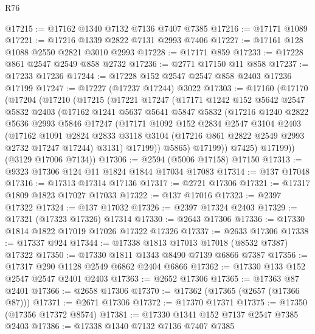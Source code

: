 \begin{lexlean}{R76}
\begin{coremodule}
@17215 := @17162 @1340 @7132 @7136 @7407 @7385
@17216 := @17171 @1089
@17221 := @17216 @1339 @2822 @7131 @2993 @7406
@17227 := @17161 @128 @1088 @2550 @2821 @3010 @2993
@17228 := @17171 @859
@17233 := @17228 @861 @2547 @2549 @858 @2732
@17236 := @2771 @17150 @11 @858
@17237 := @17233 @17236
@17244 := @17228 @152 @2547 @2547 @858 @2403 @17236 @17199
@17247 := @17227 (@17237 @17244) @3022
@17303 := @17160
    (@17170
      (@17204
        (@17210
          (@17215
            (@17221
              @17247
              (@17171
                @1242
                @152
                @5642
                @2547
                @5832
                @2403
                (@17162
                  @1241
                  @5637
                  @5641
                  @5847
                  @5832
                  (@17216
                    @1240
                    @2822
                    @5636
                    @2993
                    @5846
                    @17247
                    (@17171
                      @1092
                      @152
                      @2834
                      @2547
                      @3104
                      @2403
                      (@17162
                        @1091
                        @2824
                        @2833
                        @3118
                        @3104
                        (@17216 @861 @2822 @2549 @2993 @2732 @17247 @17244)
                        @3131)
                      @17199))
                  @5865)
                @17199))
            @7425)
          @17199))
      (@3129 @17006 @7134))
@17306 := @2594 (@5006 @17158) @17150
@17313 := @9323 @17306 @124 @11 @1824 @1844 @17034 @17083
@17314 := @137 @17048
@17316 := @17313 @17314 @17136
@17317 := @2721 @17306
@17321 := @17317 @1809 @1823 @17027 @17033
@17322 := @137 @17016
@17323 := @2397 @17322
@17324 := @137 @17032
@17326 := @2397 @17324 @2403
@17329 := @17321 (@17323 @17326) @17314
@17330 := @2643 @17306
@17336 := @17330 @1814 @1822 @17019 @17026 @17322 @17326
@17337 := @2633 @17306
@17338 := @17337 @924
@17344 := @17338 @1813 @17013 @17018 (@8532 @7387) @17322
@17350 := @17330 @1811 @1343 @8490 @7139 @6866 @7387
@17356 := @17317 @290 @1128 @2549 @6862 @2404 @6866
@17362 := @17330 @133 @152 @2547 @2547 @2401 @2403
@17363 := @2652 @17306
@17365 := @17363 @87 @2401
@17366 := @2658 @17306
@17370 := @17362 (@17365 (@2657 (@17366 @87)))
@17371 := @2671 @17306
@17372 := @17370 @17371
@17375 := @17350 (@17356 @17372 @8574)
@17381 := @17330 @1341 @152 @7137 @2547 @7385 @2403
@17386 := @17338 @1340 @7132 @7136 @7407 @7385

\end{coremodule}
\end{lexlean}
